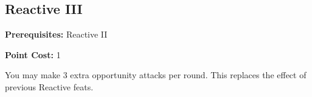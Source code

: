 \subsection{Reactive III}\label{feat:reactive3}

\noindent
\textbf{Prerequisites:} Reactive II

\noindent
\textbf{Point Cost:} 1

You may make 3 extra opportunity attacks per round. This replaces the effect
of previous Reactive feats.
